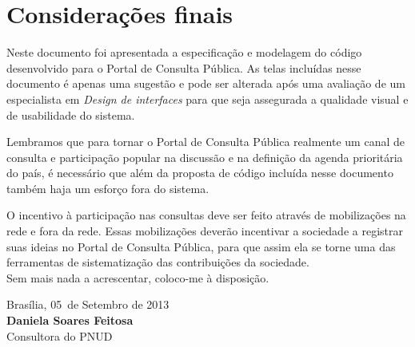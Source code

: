 \documentclass[11pt]{article}
\newcommand{\MyName}{Daniela Soares Feitosa}
\newcommand{\MesEntrega}{Setembro de 2013}
\newcommand{\DiaEntrega}{05}
\begin{document}
\newpage

\section{Considerações finais}

Neste documento foi apresentada a especificação e modelagem do código
desenvolvido para o Portal de Consulta Pública. As telas incluídas nesse
documento é apenas uma sugestão e pode ser alterada após uma avaliação
de um especialista em {\it Design de interfaces} para que seja
assegurada a qualidade visual e de usabilidade do sistema.

Lembramos que para tornar o Portal de Consulta Pública realmente um canal de
consulta e participação popular na discussão e na definição da agenda
prioritária do país, é necessário que além da proposta de código
incluída nesse documento também haja um esforço fora do sistema.

O incentivo à participação nas consultas deve ser feito através de
mobilizações na rede e fora da rede. Essas mobilizações deverão
incentivar a sociedade a registrar suas ideias no Portal de Consulta
Pública, para que assim ela se torne uma das ferramentas de
sistematização das contribuições da sociedade.\\[1cm]

Sem mais nada a acrescentar, coloco-me à disposição.\\[1cm]

\begin{minipage}{\textwidth}
  Brasília, \DiaEntrega \ de \MesEntrega\\[1cm]
  \textbf{\MyName}\\
  \small Consultora do PNUD
\end{minipage}

\newpage
\appendix
\appendixpage

\end{document}
